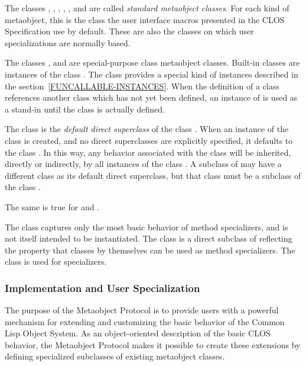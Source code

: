 The classes , ,
, ,
, 
 and  are called
\emph{standard 
  metaobject classes}. For each kind of metaobject, this is the class the user
interface macros presented in the CLOS Specification use by default. These are
also the classes on which user specializations are normally based.

The classes ,  and
 are special-purpose class metaobject classes. Built-in
classes are instances of the class . The class
 provides a special kind of instances described in the
section~\ref{FUNCALLABLE-INSTANCES}. When the definition of a class
references another class which has not yet been defined, an instance of
 is used as a stand-in until the class is actually
defined. 

The class  is the \emph{default direct superclass} of the class
. When an instance of the class  is
created, and no 
direct superclasses are explicitly specified, it defaults to the class
. In this way, any behavior associated with the class
 will be inherited, directly or indirectly, by all
instances of
the class . A subclass of  may have a
different 
class as its default direct superclass, but that class must be a subclass of the
class . 

The same is true for  and
. 

The class  captures only the most basic behavior of method
specializers, and is not itself intended to be instantiated. The class  is
a direct subclass of  reflecting the property that classes by
themselves can be used as method specializers. The class  is used
for  specializers. 

\subsubsection{Implementation and User Specialization}
\label{IMPLEMENTATION-AND-USER-SPECIALIZATION}

The purpose of the Metaobject Protocol is to provide users with a powerful
mechanism for extending and customizing the basic behavior of the Common Lisp
Object System. As an object-oriented description of the basic CLOS behavior, the
Metaobject Protocol makes it possible to create these extensions by defining
specialized subclasses of existing metaobject classes. 

